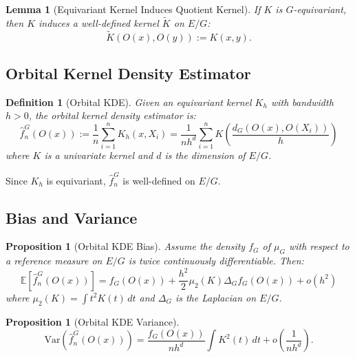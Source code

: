 \documentclass[11pt]{article}
\newtheorem{lemma}[theorem]{Lemma}
\newtheorem{proposition}[theorem]{Proposition}
\newtheorem{definition}[theorem]{Definition}
\newcommand{\E}{\mathbb{E}}
\newcommand{\Var}{\mathrm{Var}}
\begin{document}
\begin{lemma}[Equivariant Kernel Induces Quotient Kernel]\label{lem:quotient_kernel}
If $K$ is $G$-equivariant, then $K$ induces a well-defined kernel $\tilde{K}$ on $E/G$:
\begin{equation}\label{eq:quotient_kernel}
\tilde{K}(O(x), O(y)) := K(x, y).
\end{equation}
\end{lemma}

\subsection{Orbital Kernel Density Estimator}

\begin{definition}[Orbital KDE]\label{def:orbital_kde}
Given an equivariant kernel $K_h$ with bandwidth $h > 0$, the orbital kernel density estimator is:
\begin{equation}\label{eq:orbital_kde}
\hat{f}_n^G(O(x)) := \frac{1}{n} \sum_{i=1}^n K_h(x, X_i) = \frac{1}{nh^d} \sum_{i=1}^n K\left( \frac{d_G(O(x), O(X_i))}{h} \right)
\end{equation}
where $K$ is a univariate kernel and $d$ is the dimension of $E/G$.
\end{definition}

Since $K_h$ is equivariant, $\hat{f}_n^G$ is well-defined on $E/G$.

\subsection{Bias and Variance}

\begin{proposition}[Orbital KDE Bias]\label{prop:kde_bias}
Assume the density $f_G$ of $\mu_G$ with respect to a reference measure on $E/G$ is twice continuously differentiable. Then:
\begin{equation}\label{eq:kde_bias}
\E[\hat{f}_n^G(O(x))] = f_G(O(x)) + \frac{h^2}{2} \mu_2(K) \Delta_G f_G(O(x)) + o(h^2)
\end{equation}
where $\mu_2(K) = \int t^2 K(t) \, dt$ and $\Delta_G$ is the Laplacian on $E/G$.
\end{proposition}

\begin{proposition}[Orbital KDE Variance]\label{prop:kde_variance}
\begin{equation}\label{eq:kde_variance}
\Var(\hat{f}_n^G(O(x))) = \frac{f_G(O(x))}{nh^d} \int K^2(t) \, dt + o\left( \frac{1}{nh^d} \right).
\end{equation}
\end{proposition}
\end{document}
